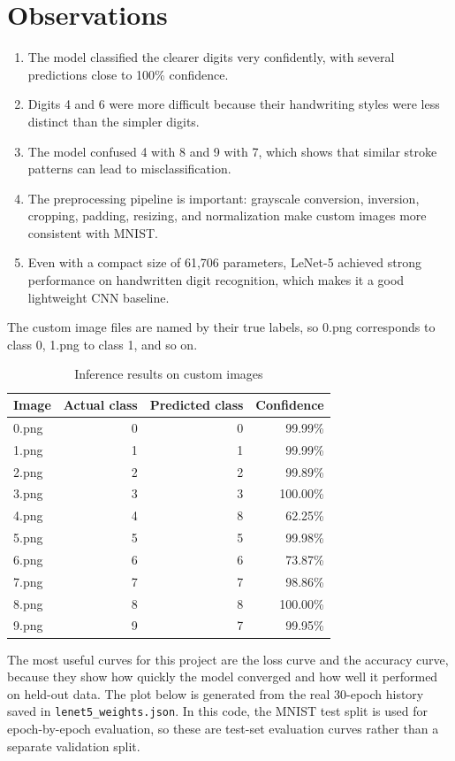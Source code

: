 \documentclass[11pt,a4paper]{article}
\begin{document}
\section{Observations}
\begin{enumerate}[leftmargin=*]
  \item The model classified the clearer digits very confidently, with several predictions close to 100\% confidence.
  \item Digits 4 and 6 were more difficult because their handwriting styles were less distinct than the simpler digits.
  \item The model confused 4 with 8 and 9 with 7, which shows that similar stroke patterns can lead to misclassification.
  \item The preprocessing pipeline is important: grayscale conversion, inversion, cropping, padding, resizing, and normalization make custom images more consistent with MNIST.
  \item Even with a compact size of 61,706 parameters, LeNet-5 achieved strong performance on handwritten digit recognition, which makes it a good lightweight CNN baseline.
\end{enumerate}

The custom image files are named by their true labels, so 0.png corresponds to class 0, 1.png to class 1, and so on.

\begin{table}[h]
\centering
\caption{Inference results on custom images}
\begin{tabular}{lrrr}
\toprule
Image & Actual class & Predicted class & Confidence \\
\midrule
0.png & 0 & 0 & 99.99\% \\
1.png & 1 & 1 & 99.99\% \\
2.png & 2 & 2 & 99.89\% \\
3.png & 3 & 3 & 100.00\% \\
4.png & 4 & 8 & 62.25\% \\
5.png & 5 & 5 & 99.98\% \\
6.png & 6 & 6 & 73.87\% \\
7.png & 7 & 7 & 98.86\% \\
8.png & 8 & 8 & 100.00\% \\
9.png & 9 & 7 & 99.95\% \\
\bottomrule
\end{tabular}
\end{table}

The most useful curves for this project are the loss curve and the accuracy curve, because they show how quickly the model converged and how well it performed on held-out data. The plot below is generated from the real 30-epoch history saved in \texttt{lenet5\_weights.json}. In this code, the MNIST test split is used for epoch-by-epoch evaluation, so these are test-set evaluation curves rather than a separate validation split.
\end{document}
